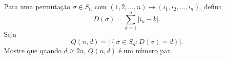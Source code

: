 Para uma permutação \( \sigma\in S_n\) com \( (1,2,\dots,n)\mapsto(i_1,i_2,\dots,i_n)\), defina
\[ D(\sigma) = \sum_{k = 1}^n |i_k - k|. \]
Seja
\[ Q(n,d) = \left|\left\{\sigma\in S_n : D(\sigma) = d\right\}\right|. \]
Mostre que quando \( d \geq 2n\), \( Q(n,d)\) é um número par.
